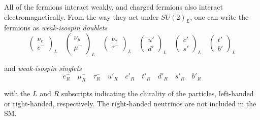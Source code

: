     All of the fermions interact weakly, and charged fermions also interact electromagnetically.
    From the way they act under $SU(2)_L$, one can write the fermions as \textit{weak-isospin doublets}
    \begin{equation*}
        \begin{pmatrix}
            \nu_e \\
            e^-
        \end{pmatrix}_L
        \quad
        \begin{pmatrix}
            \nu_\mu \\
            \mu^-
        \end{pmatrix}_L
        \quad
        \begin{pmatrix}
            \nu_\tau \\
            \tau^-
        \end{pmatrix}_L
        \quad
        \begin{pmatrix}
            u' \\
            d'
        \end{pmatrix}_L
        \quad
        \begin{pmatrix}
            c' \\
            s'
        \end{pmatrix}_L
        \quad
        \begin{pmatrix}
            t' \\
            b'
        \end{pmatrix}_L
    \end{equation*}

    and \textit{weak-isospin singlets}
    \begin{equation*}
        e^-_R
        \quad
        \mu^-_R
        \quad
        \tau^-_R
        \quad
        u'_R
        \quad
        c'_R
        \quad
        t'_R
        \quad
        d'_R
        \quad
        s'_R
        \quad
        b'_R
    \end{equation*}

    with the $L$ and $R$ subscripts indicating the chirality of the particles, left-handed or right-handed, respectively.
    The right-handed neutrinos are not included in the \gls{SM}.